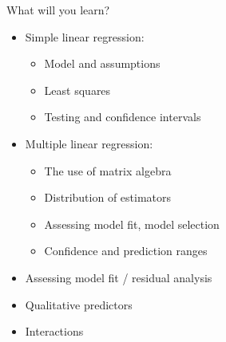 \documentclass[10pt,ignorenonframetext,]{beamer}
\providecommand{\tightlist}{%
  \setlength{\itemsep}{0pt}\setlength{\parskip}{0pt}}
\begin{document}
\begin{frame}

\begin{block}{What will you learn?}

\vspace{2mm}

\begin{itemize}
\tightlist
\item
  Simple linear regression:

  \begin{itemize}
  \tightlist
  \item
    Model and assumptions
  \item
    Least squares
  \item
    Testing and confidence intervals
  \end{itemize}
\end{itemize}

\vspace{2mm}

\begin{itemize}
\tightlist
\item
  Multiple linear regression:

  \begin{itemize}
  \tightlist
  \item
    The use of matrix algebra
  \item
    Distribution of estimators
  \item
    Assessing model fit, model selection
  \item
    Confidence and prediction ranges
  \end{itemize}
\end{itemize}

\vspace{2mm}

\begin{itemize}
\tightlist
\item
  Assessing model fit / residual analysis
\end{itemize}

\vspace{2mm}

\begin{itemize}
\tightlist
\item
  Qualitative predictors
\end{itemize}

\vspace{2mm}

\begin{itemize}
\tightlist
\item
  Interactions
\end{itemize}

\end{block}

\end{frame}
\end{document}
